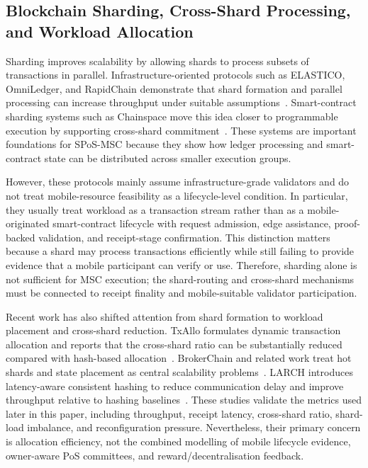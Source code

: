\documentclass[a4paper,fleqn]{cas-sc}
\begin{document}
\subsection{Blockchain Sharding, Cross-Shard Processing, and Workload Allocation}\label{subsec:sharding}

Sharding improves scalability by allowing shards to process subsets of transactions in parallel. Infrastructure-oriented protocols such as ELASTICO, OmniLedger, and RapidChain demonstrate that shard formation and parallel processing can increase throughput under suitable assumptions~\cite{Luu2016,Kokoris-Kogias2018,Zamani2018a}. Smart-contract sharding systems such as Chainspace move this idea closer to programmable execution by supporting cross-shard commitment~\cite{Al-Bassam}. These systems are important foundations for SPoS-MSC because they show how ledger processing and smart-contract state can be distributed across smaller execution groups.

However, these protocols mainly assume infrastructure-grade validators and do not treat mobile-resource feasibility as a lifecycle-level condition. In particular, they usually treat workload as a transaction stream rather than as a mobile-originated smart-contract lifecycle with request admission, edge assistance, proof-backed validation, and receipt-stage confirmation. This distinction matters because a shard may process transactions efficiently while still failing to provide evidence that a mobile participant can verify or use. Therefore, sharding alone is not sufficient for MSC execution; the shard-routing and cross-shard mechanisms must be connected to receipt finality and mobile-suitable validator participation.

Recent work has also shifted attention from shard formation to workload placement and cross-shard reduction. TxAllo formulates dynamic transaction allocation and reports that the cross-shard ratio can be substantially reduced compared with hash-based allocation~\cite{Zhang2023TxAllo}. BrokerChain and related work treat hot shards and state placement as central scalability problems~\cite{Huang2022Brokerchain}. LARCH introduces latency-aware consistent hashing to reduce communication delay and improve throughput relative to hashing baselines~\cite{jorika2026larch}. These studies validate the metrics used later in this paper, including throughput, receipt latency, cross-shard ratio, shard-load imbalance, and reconfiguration pressure. Nevertheless, their primary concern is allocation efficiency, not the combined modelling of mobile lifecycle evidence, owner-aware PoS committees, and reward/decentralisation feedback.
\end{document}
